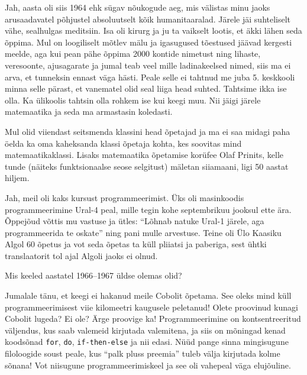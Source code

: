 Jah, aasta oli siis 1964 ehk sügav nõukogude aeg, mis välistas minu jaoks arusaadavatel
põhjustel absoluutselt kõik humanitaaralad. Järele jäi suhteliselt vähe, sealhulgas meditsiin. Isa oli kirurg ja ju ta
vaikselt lootis, et äkki lähen seda õppima. Mul on loogiliselt mõtlev mälu ja
igasugused tõestused jäävad kergesti meelde, aga kui pean
pähe õppima 2000 kontide nimetust ning lihaste, veresoonte,
ajusagarate ja jumal teab veel mille ladinakeelsed nimed, siis ma ei
arva, et tunneksin ennast väga hästi. Peale selle ei tahtnud me juba 5. keskkooli
minna selle pärast, et vanematel olid seal liiga head suhted.
Tahtsime ikka ise olla. Ka ülikoolis tahtsin olla rohkem ise kui keegi muu.
Nii jäigi järele matemaatika ja seda ma armastasin koledasti.

Mul olid viiendast seitsmenda klassini head õpetajad ja ma ei saa midagi
paha öelda ka oma kaheksanda klassi õpetaja kohta, kes soovitas mind matemaatikaklassi. Lisaks matemaatika õpetamise korüfee Olaf
Prinits, kelle tunde (näiteks funktsionaalse seose selgitust) mäletan siiamaani, ligi 50 aastat hiljem.


Jah, meil oli kaks kursust programmeerimist. Üks oli masinkoodis
programmeerimine Ural-4 peal, mille tegin
kohe septembrikuu jooksul ette ära. Õppejõud võttis mu
vastuse ja ütles: \enquote{Lõhnab natuke Ural-1 järele, aga programmeerida te
oskate} ning pani mulle arvestuse. Teine oli Ülo Kaasiku Algol 60 õpetus ja vot seda õpetas ta küll pliiatsi ja
paberiga, sest ühtki translaatorit tol ajal Algoli jaoks ei olnud.


Mis keeled aastatel 1966--1967 üldse olemas olid?

Jumalale tänu, et keegi ei hakanud meile Cobolit õpetama. See
oleks mind küll programmeerimisest viie kilomeetri kaugusele peletanud! Olete
proovinud kunagi Cobolit lugeda? Ei ole? Ärge proovige ka! Programmeerimine
on kontsentreeritud väljendus, kus saab valemeid kirjutada valemitena, ja
siis on mõningad kenad koodsõnad \verb|for|, \verb|do|,
\verb|if-then-else| ja nii edasi. Nüüd pange sinna mingisugune filoloogide
soust peale, kus \enquote{palk pluss preemia} tuleb välja kirjutada kolme
sõnana! Vot niisugune programmeerimiskeel ja see oli vahepeal väga elujõuline.

